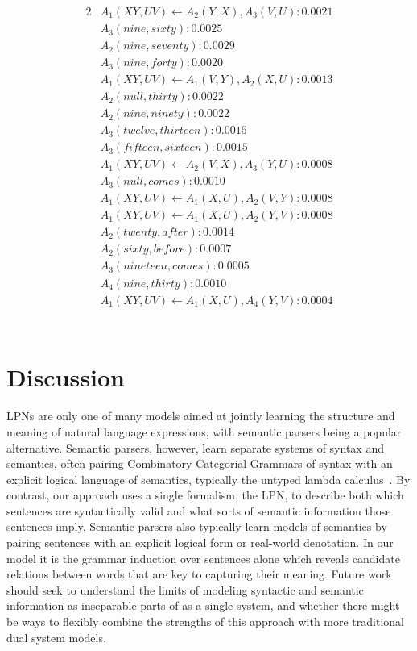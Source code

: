 \documentclass[11pt, twocolumn]{article}
\begin{document}
\begin{alignat*}{2}
&A_1(X Y, U V) \leftarrow A_2(Y, X), A_3(V, U) : 0.0021 \\
&A_3(nine, sixty) : 0.0025 \\
&A_2(nine, seventy) : 0.0029 \\
&A_3(nine, forty) : 0.0020 \\
&A_1(X Y, U V) \leftarrow A_1(V, Y), A_2(X, U) : 0.0013 \\
&A_2(null, thirty) : 0.0022 \\
&A_2(nine, ninety) : 0.0022 \\
&A_3(twelve, thirteen) : 0.0015 \\
&A_3(fifteen, sixteen) : 0.0015 \\
&A_1(X Y, U V) \leftarrow A_2(V, X), A_3(Y, U) : 0.0008 \\
&A_3(null, comes) : 0.0010 \\
&A_1(X Y, U V) \leftarrow A_1(X, U), A_2(V, Y) : 0.0008 \\
&A_1(X Y, U V) \leftarrow A_1(X, U), A_2(Y, V) : 0.0008 \\
&A_2(twenty, after) : 0.0014 \\
&A_2(sixty, before) : 0.0007 \\
&A_3(nineteen, comes) : 0.0005 \\
&A_4(nine, thirty) : 0.0010 \\
&A_1(X Y, U V) \leftarrow A_1(X, U), A_4(Y, V) : 0.0004 \\
\end{alignat*} \\
\section{Discussion}


LPNs are only one of many models aimed at jointly learning the
structure and meaning of natural language expressions, with semantic
parsers being a popular alternative. Semantic parsers, however, learn
separate systems of syntax and semantics, often pairing Combinatory
Categorial Grammars of syntax with an explicit logical language of
semantics, typically the untyped lambda
calculus~\cite{berant2013semantic, liang2013learning,
  kwiatkowski2010inducing}. By contrast, our approach uses a single
formalism, the LPN, to describe both which sentences are syntactically
valid and what sorts of semantic information those sentences
imply. Semantic parsers also typically learn models of semantics by
pairing sentences with an explicit logical form or real-world
denotation. In our model it is the grammar induction over sentences
alone which reveals candidate relations between words that are key to
capturing their meaning. Future work should seek to understand the
limits of modeling syntactic and semantic information as inseparable
parts of as a single system, and whether there might be ways to
flexibly combine the strengths of this approach with more traditional
dual system models.
\end{document}
